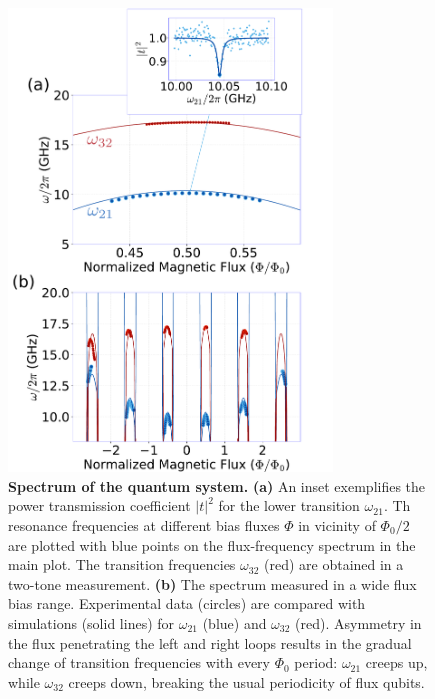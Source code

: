 \documentclass[%
reprint,
superscriptaddress,
bibnotes,
amsmath,
amssymb,
aps,
showkeys,
prb,
]{revtex4-2}
\newcommand{\iabsSquared}[1]{\ensuremath{\left|#1\right|^2}}
\begin{document}
\begin{figure}[h]
  \includegraphics[width=86mm]{fig2}
  \caption{\small \textbf{Spectrum of the quantum system.} {\bf(a)} An inset exemplifies 
  the power transmission coefficient \iabsSquared{t} for the  lower transition $\omega_{21}$. 
  Th resonance frequencies at different bias fluxes $\Phi$ in vicinity of $\Phi_0/2$ are plotted with blue  points on  the  
  flux-frequency  spectrum in the main plot. The transition frequencies
    $\omega_{32}$  (red) are obtained in a two-tone  measurement.
    {\bf{(b)}} The spectrum measured in a wide flux bias range. Experimental data (circles) are compared with 
    simulations (solid lines) for $   \omega_{21}  $   (blue)  and
    $ \omega_{32}$ (red).  Asymmetry  in the flux penetrating the left and  right loops results in
    the  gradual   change  of   transition  frequencies   with  every   $  \Phi_{0}   $  period:
    $\omega_{21}$ creeps  up, while $\omega_{32}$ creeps  down, breaking the usual  periodicity of flux
    qubits.
  }
  \label{fig:transmission}
\end{figure}
\end{document}
